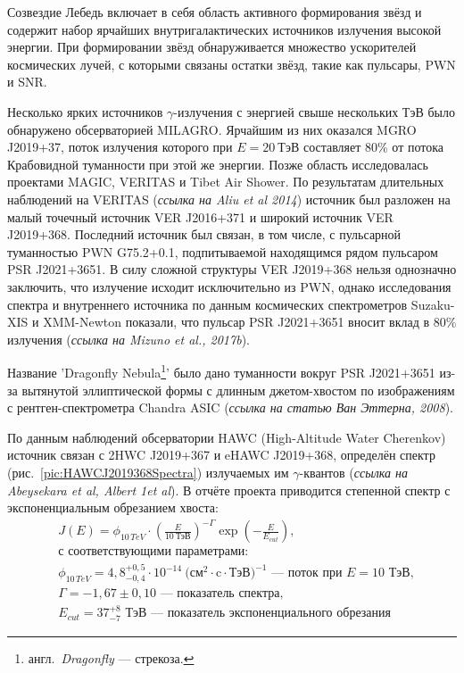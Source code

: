 \documentclass[magd,floatypics,numeref]{msudipl} %
\begin{document}
Созвездие Лебедь включает в себя область активного формирования звёзд и содержит набор ярчайших внутригалактических источников излучения высокой энергии. При формировании звёзд обнаруживается множество ускорителей космических лучей, с которыми связаны остатки звёзд, такие как пульсары, PWN и SNR. 

Несколько ярких источников $\gamma$-излучения с энергией свыше нескольких ТэВ было обнаружено обсерваторией MILAGRO. Ярчайшим из них оказался MGRO J2019+37, поток излучения которого при $E=20~\text{ТэВ}$ составляет 80\% от потока Крабовидной туманности при этой же энергии. Позже область исследовалась проектами MAGIC, VERITAS и Tibet Air Shower. По результатам длительных  наблюдений на VERITAS (\textit{ссылка на Aliu et al 2014}) источник был разложен на малый точечный источник VER J2016+371 и широкий источник VER J2019+368. Последний источник был связан, в том числе, с пульсарной туманностью PWN G75.2+0.1, подпитываемой находящимся рядом пульсаром PSR J2021+3651. В силу сложной структуры VER J2019+368 нельзя однозначно заключить, что излучение исходит исключительно из PWN, однако исследования спектра и внутреннего источника  по данным космических спектрометров Suzaku-XIS и XMM-Newton показали, что пульсар PSR J2021+3651 вносит вклад в 80\% излучения (\textit{ссылка на Mizuno et al., 2017b}). 

Название 'Dragonfly Nebula\footnote{англ.~\textit{Dragonfly} --- стрекоза.}' было дано туманности вокруг PSR J2021+3651 из-за вытянутой эллиптической формы с длинным джетом-хвостом по изображениям с рентген-спектрометра Chandra ASIC (\textit{ссылка на статью Ван Эттерна, 2008}). 

По данным наблюдений обсерватории HAWC (High-Altitude Water Cherenkov) источник связан с 2HWC J2019+367 и eHAWC J2019+368, определён спектр (рис.~\ref{pic:HAWCJ2019368Spectra}) \afterpage{\clearpage} излучаемых им $\gamma$-квантов (\textit{ссылка на Abeysekara et al, Albert 1et al}). В отчёте проекта приводится степенной спектр с экспоненциальным обрезанием хвоста:
\[
\begin{aligned}
&J(E)=\phi_{10\,TeV} \cdot\left(\frac{E}{10~\text{ТэВ}}\right)^{-\Gamma} \exp \left(-\frac{E}{E_{cut}}\right),\\
&\text{с соответствующими параметрами:}\\
&\phi_{10\,TeV} = 4,\!8^{+0{,}5}_{-0{,}4}\cdot 10^{-14}~\text{($\text{см}^2\cdot \text{c}\cdot \text{ТэВ})^{-1}$ --- поток при $E = 10$~ТэВ},\\
&\Gamma=-1{,}67\pm 0,\!10 \text{ --- показатель спектра},\\
&E_{cut} = 37^{+8}_{-7} \text{ ТэВ --- показатель экспоненциального обрезания}
\end{aligned}
\]
\end{document}

